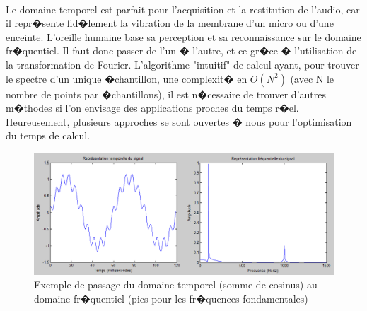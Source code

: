         	\paragraph{}
        	Le domaine temporel est parfait pour l'acquisition et la restitution de l'audio, car il repr�sente fid�lement la vibration 
        	de la membrane d'un micro ou d'une enceinte. L'oreille humaine base sa perception et sa reconnaissance sur le domaine fr�quentiel. 
        	Il faut donc passer de l'un � l'autre, et ce gr�ce � l'utilisation de la transformation de Fourier. L'algorithme "intuitif" 
        	de calcul ayant, pour trouver le spectre d'un unique �chantillon, une complexit� en $O(N^2)$  (avec N le nombre de points par 
        	�chantillons), il est n�cessaire de trouver d'autres m�thodes si l'on envisage des applications proches du temps r�el.  
        	Heureusement, plusieurs approches se sont ouvertes � nous pour l'optimisation du temps de calcul.
        	\begin{figure}[H]
				\begin{center}
					\includegraphics[width=15cm]{Images/tf2.png} 
				\end{center}
				\caption{Exemple de passage du domaine temporel (somme de cosinus) au domaine fr�quentiel (pics pour les fr�quences fondamentales)}
		\end{figure}
